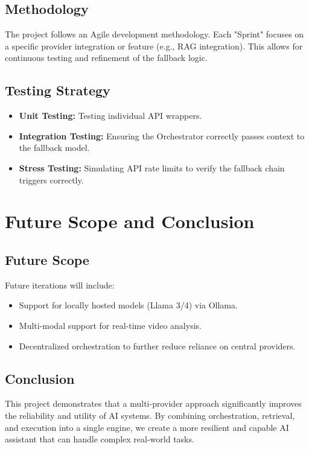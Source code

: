 \documentclass[12pt, a4paper]{report}
\begin{document}
\section{Methodology}
The project follows an Agile development methodology. Each "Sprint" focuses on a specific provider integration or feature (e.g., RAG integration). This allows for continuous testing and refinement of the fallback logic.

\section{Testing Strategy}
\begin{itemize}
    \item \textbf{Unit Testing:} Testing individual API wrappers.
    \item \textbf{Integration Testing:} Ensuring the Orchestrator correctly passes context to the fallback model.
    \item \textbf{Stress Testing:} Simulating API rate limits to verify the fallback chain triggers correctly.
\end{itemize}

\chapter{Future Scope and Conclusion}

\section{Future Scope}
Future iterations will include:
\begin{itemize}
    \item Support for locally hosted models (Llama 3/4) via Ollama.
    \item Multi-modal support for real-time video analysis.
    \item Decentralized orchestration to further reduce reliance on central providers.
\end{itemize}

\section{Conclusion}
This project demonstrates that a multi-provider approach significantly improves the reliability and utility of AI systems. By combining orchestration, retrieval, and execution into a single engine, we create a more resilient and capable AI assistant that can handle complex real-world tasks.
\end{document}
